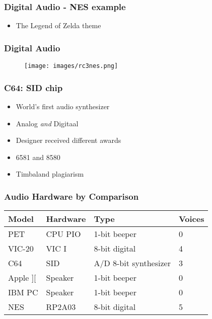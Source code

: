 
\begin{frame}
\frametitle{Digital Audio - NES example}

\begin{itemize}
\item The Legend of Zelda theme
\end{itemize}

\end{frame}


\begin{frame}
\frametitle{Digital Audio}

\begin{figure}
\texttt{[image: images/rc3nes.png]}
\end{figure}

\end{frame}


\begin{frame}
\frametitle{C64: SID chip}

\begin{itemize}
\item World's first audio synthesizer
\item Analog \emph{and} Digitaal
\item Designer received different awards
\item 6581 and 8580
\item Timbaland plagiarism
\end{itemize}

\end{frame}


\begin{frame}
\frametitle{Audio Hardware by Comparison}

\begin{tabular}{|l|l|l|l|}
\hline Model & Hardware & Type & Voices \\ \hline
PET & CPU PIO & 1-bit beeper & 0 \\
VIC-20 & VIC I & 8-bit digital & 4 \\
C64 & SID & A/D 8-bit synthesizer & 3 \\ \hline
Apple ][ & Speaker & 1-bit beeper & 0 \\
IBM PC & Speaker & 1-bit beeper & 0 \\
NES & RP2A03 & 8-bit digital & 5 \\ \hline
\end{tabular}

\end{frame}

